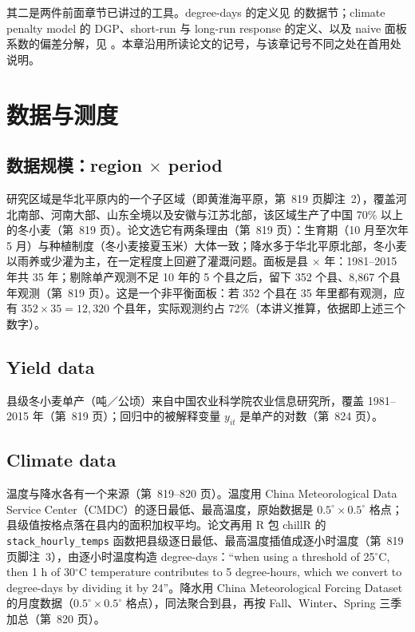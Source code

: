 其二是两件前面章节已讲过的工具。degree-days 的定义见  的数据节；climate penalty model 的 DGP、short-run 与 long-run response 的定义、以及 naive 面板系数的偏差分解，见 。本章沿用所读论文的记号，与该章记号不同之处在首用处说明。

\section{数据与测度}

\subsection{数据规模：region $\times$ period}

研究区域是华北平原内的一个子区域（即黄淮海平原，第~819 页脚注~2），覆盖河北南部、河南大部、山东全境以及安徽与江苏北部，该区域生产了中国 70\% 以上的冬小麦（第~819 页）。论文选它有两条理由（第~819 页）：生育期（10 月至次年 5 月）与种植制度（冬小麦接夏玉米）大体一致；降水多于华北平原北部，冬小麦以雨养或少灌为主，在一定程度上回避了灌溉问题。面板是县 $\times$ 年：1981--2015 年共 35 年；剔除单产观测不足 10 年的 5 个县之后，留下 352 个县、8{,}867 个县年观测（第~819 页）。这是一个非平衡面板：若 352 个县在 35 年里都有观测，应有 $352\times35=12{,}320$ 个县年，实际观测约占 72\%（本讲义推算，依据即上述三个数字）。

\subsection{Yield data}

县级冬小麦单产（吨／公顷）来自中国农业科学院农业信息研究所，覆盖 1981--2015 年（第~819 页）；回归中的被解释变量 $y_{it}$ 是单产的对数（第~824 页）。

\subsection{Climate data}

温度与降水各有一个来源（第~819--820 页）。温度用 China Meteorological Data Service Center（CMDC）的逐日最低、最高温度，原始数据是 $0.5^\circ\times0.5^\circ$ 格点；县级值按格点落在县内的面积加权平均。论文再用 R 包 chillR 的 \texttt{stack\_hourly\_temps} 函数把县级逐日最低、最高温度插值成逐小时温度（第~819 页脚注~3），由逐小时温度构造 degree-days：``when using a threshold of 25$^\circ$C, then 1 h of 30$^\circ$C temperature contributes to 5 degree-hours, which we convert to degree-days by dividing it by 24''\citep[第~819 页]{da2024climate}。降水用 China Meteorological Forcing Dataset 的月度数据（$0.5^\circ\times0.5^\circ$ 格点），同法聚合到县，再按 Fall、Winter、Spring 三季加总（第~820 页）。

